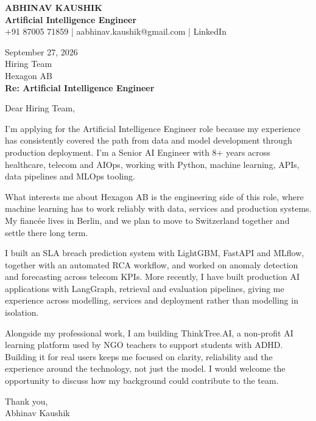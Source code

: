 \documentclass[10pt,a4paper]{article}
\begin{document}
\begin{center}
{\Large\bfseries ABHINAV KAUSHIK}\\[2pt]
{\bfseries Artificial Intelligence Engineer}\\[2pt]
+91 87005 71859 \quad | \quad aabhinav.kaushik@gmail.com \quad | \quad LinkedIn
\end{center}
\vspace{8pt}
September 27, 2026\\[6pt]
Hiring Team\\
Hexagon AB\\[4pt]
\textbf{Re: Artificial Intelligence Engineer}

Dear Hiring Team,

I’m applying for the Artificial Intelligence Engineer role because my experience has consistently covered the path from data and model development through production deployment. I’m a Senior AI Engineer with 8+ years across healthcare, telecom and AIOps, working with Python, machine learning, APIs, data pipelines and MLOps tooling.

What interests me about Hexagon AB is the engineering side of this role, where machine learning has to work reliably with data, services and production systems. My fiancée lives in Berlin, and we plan to move to Switzerland together and settle there long term.

I built an SLA breach prediction system with LightGBM, FastAPI and MLflow, together with an automated RCA workflow, and worked on anomaly detection and forecasting across telecom KPIs. More recently, I have built production AI applications with LangGraph, retrieval and evaluation pipelines, giving me experience across modelling, services and deployment rather than modelling in isolation.

Alongside my professional work, I am building ThinkTree.AI, a non-profit AI learning platform used by NGO teachers to support students with ADHD. Building it for real users keeps me focused on clarity, reliability and the experience around the technology, not just the model. I would welcome the opportunity to discuss how my background could contribute to the team.

Thank you,\\
Abhinav Kaushik
\end{document}
